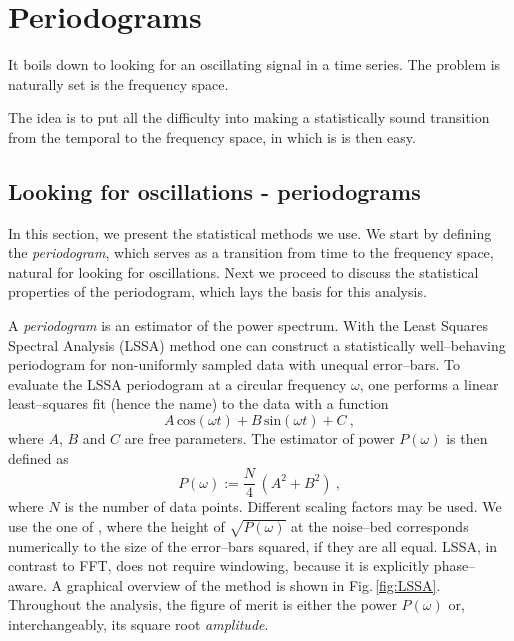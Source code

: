 \chapter{Periodograms}
\label{ch:axions-periodograms}

It boils down to looking for an oscillating signal in a time series. The problem is naturally set is the frequency space.

The idea is to put all the difficulty into making a statistically sound transition from the temporal to the frequency space, in which is is then easy.


\section{Looking for oscillations - periodograms}
In this section, we present the statistical methods we use. We start by defining the \emph{periodogram}, which serves as a transition from time to the frequency space, natural for looking for oscillations. Next we proceed to discuss the statistical properties of the periodogram, which lays the basis for this analysis.

A \emph{periodogram} is an estimator of the power spectrum. With the Least Squares Spectral Analysis (LSSA) method one can construct a statistically well--behaving periodogram for non-uniformly sampled data with unequal error--bars. To evaluate the LSSA periodogram at a circular frequency $\omega$, one performs a linear least--squares fit (hence the name) to the data with a function
\begin{equation}
  A\,\mathrm{cos}(\omega t) + B\,\mathrm{sin}(\omega t) + C \ ,
\end{equation}
where $A$, $B$ and $C$ are free parameters. The estimator of power $P(\omega)$ is then defined as
\begin{equation}
  P(\omega) := \frac{N}{4} \, \left( A^2 + B^2 \right) \ ,
\end{equation}
where $N$ is the number of data points. Different scaling factors may be used. We use the one of \cite{Scargle1982}, where the height of $\sqrt{P(\omega)}$ at the noise--bed corresponds numerically to the size of the error--bars squared, if they are all equal. LSSA, in contrast to FFT, does not require windowing, because it is explicitly phase--aware. A graphical overview of the method is shown in Fig.\,\ref{fig:LSSA}. Throughout the analysis, the figure of merit is either the power $P(\omega)$ or, interchangeably, its square root \emph{amplitude}. 

